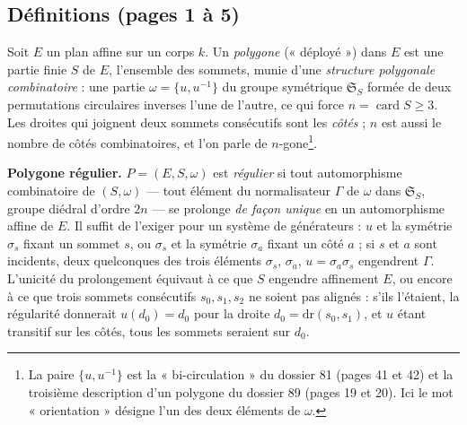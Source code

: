 \documentclass[11pt,a4paper]{article}
\begin{document}
\subsection*{Définitions (pages 1 à 5)}

Soit $E$ un plan affine sur un corps $k$. Un \emph{polygone} (« déployé »)
dans $E$ est une partie finie $S$ de $E$, l'ensemble des sommets, munie d'une
\emph{structure polygonale combinatoire} : une partie $\omega = \{u,
u^{-1}\}$ du groupe symétrique $\mathfrak{S}_S$ formée de deux permutations
circulaires inverses l'une de l'autre, ce qui force $n = \operatorname{card} S
\geq 3$. Les droites qui joignent deux sommets consécutifs sont les
\emph{côtés} ; $n$ est aussi le nombre de côtés combinatoires, et l'on parle de
$n$-gone\footnote{La paire $\{u, u^{-1}\}$ est la « bi-circulation » du
dossier 81 (pages 41 et 42) et la troisième description d'un polygone du
dossier 89 (pages 19 et 20). Ici le mot « orientation » désigne l'un des deux
éléments de $\omega$.}.

\textbf{Polygone régulier.} $P = (E, S, \omega)$ est \emph{régulier} si tout
automorphisme combinatoire de $(S, \omega)$ --- tout élément du normalisateur
$\Gamma$ de $\omega$ dans $\mathfrak{S}_S$, groupe diédral d'ordre $2n$ --- se
prolonge \emph{de façon unique} en un automorphisme affine de $E$. Il suffit
de l'exiger pour un système de générateurs : $u$ et la symétrie $\sigma_s$
fixant un sommet $s$, ou $\sigma_s$ et la symétrie $\sigma_a$ fixant un côté
$a$ ; si $s$ et $a$ sont incidents, deux quelconques des trois éléments
$\sigma_s$, $\sigma_a$, $u = \sigma_a \sigma_s$ engendrent $\Gamma$.
L'unicité du prolongement équivaut à ce que $S$ engendre affinement $E$, ou
encore à ce que trois sommets consécutifs $s_0, s_1, s_2$ ne soient pas
alignés : s'ils l'étaient, la régularité donnerait $u(d_0) = d_0$ pour la
droite $d_0 = \mathrm{dr}(s_0, s_1)$, et $u$ étant transitif sur les côtés,
tous les sommets seraient sur $d_0$.
\end{document}
